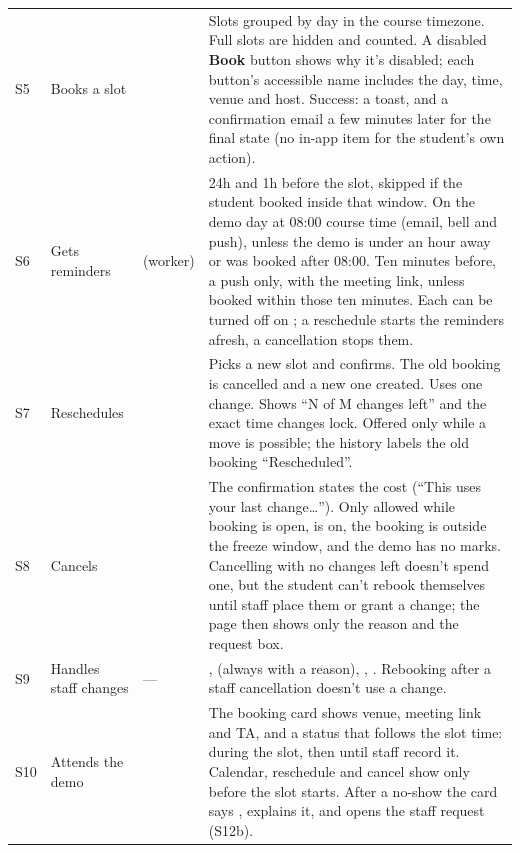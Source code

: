{\begin{xltabular}{\linewidth}{@{}l P{34mm} P{30mm} L@{}}
  S5 & Books a slot &  & Slots grouped by day in the course timezone. Full slots are hidden and counted. A disabled \textbf{Book} button shows why it's disabled; each button's accessible name includes the day, time, venue and host. Success: a toast, and a confirmation email a few minutes later for the final state (no in-app item for the student's own action).\\
  S6 & Gets reminders &  (worker) & 24h and 1h before the slot, skipped if the student booked inside that window. On the demo day at 08:00 course time (email, bell and push), unless the demo is under an hour away or was booked after 08:00. Ten minutes before, a push only, with the meeting link, unless booked within those ten minutes. Each can be turned off on ; a reschedule starts the reminders afresh, a cancellation stops them.\\
  S7 & Reschedules &  & Picks a new slot and confirms. The old booking is cancelled and a new one created. Uses one change. Shows ``N of M changes left'' and the exact time changes lock. Offered only while a move is possible; the history labels the old booking ``Rescheduled''.\\
  S8 & Cancels &  & The confirmation states the cost (``This uses your last change\dots{}''). Only allowed while booking is open,  is on, the booking is outside the freeze window, and the demo has no marks. Cancelling with no changes left doesn't spend one, but the student can't rebook themselves until staff place them or grant a change; the page then shows only the reason and the request box.\\
  S9 & Handles staff changes & --- & ,  (always with a reason), , . Rebooking after a staff cancellation doesn't use a change.\\
  S10 & Attends the demo &  & The booking card shows venue, meeting link and TA, and a status that follows the slot time:  during the slot, then  until staff record it. Calendar, reschedule and cancel show only before the slot starts. After a no-show the card says , explains it, and opens the staff request (S12b).\\

\end{xltabular}}
